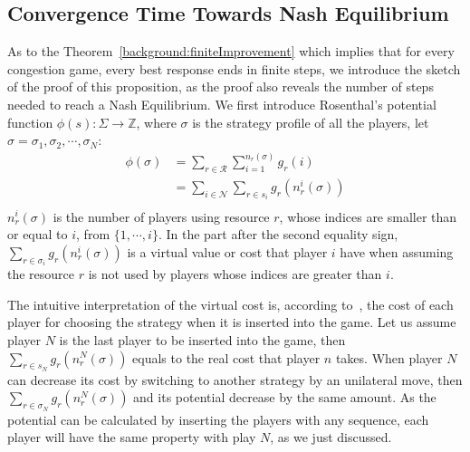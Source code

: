 \subsection{Convergence Time Towards Nash Equilibrium}
As to the Theorem~\ref{background:finiteImprovement} which implies that for every congestion game, every best response ends in finite steps, we introduce the sketch of the proof of this proposition, as the proof also reveals the number of steps needed to reach a Nash Equilibrium.
We first introduce Rosenthal's potential function $\phi(s):\Sigma\rightarrow \mathbb{Z}$, where $\sigma$ is the strategy profile of all the players, let $\sigma = \sigma_1, \sigma_2,\cdots, \sigma_N$:
\begin{equation}
\label{2:Rosenthal_potential}
\begin{split}
\phi(\sigma) 
& =\sum\limits^{}_{r\in \mathcal{R}} \sum\limits^{n_r(\sigma)}_{i=1} g_r(i)\\
& =\sum\limits_{i\in \mathcal{N}} \sum\limits^{}_{r\in s_i} g_r(n_r^i(\sigma))\\
\end{split}
\end{equation}
$n_r^i(\sigma)$ is the number of players using resource $r$, whose indices are smaller than or equal to $i$, \ie from $\{1,\cdots,i\}$. 
In the part after the second equality sign, $\sum\limits^{}_{r\in \sigma_i} g_r(n_r^i(\sigma))$ is a virtual value or cost that player $i$ have when assuming the resource $r$ is not used by players whose indices are greater than $i$.

The intuitive interpretation of the virtual cost is, according to~\cite{Voecking06congestiongames}, the cost of each player for choosing the strategy when it is inserted into the game.
Let us assume player $N$ is the last player to be inserted into the game, then $\sum\limits^{}_{r\in s_N} g_r(n_r^N(\sigma))$ equals to the real cost that player $n$ takes.
When player $N$ can decrease its cost by switching to another strategy by an unilateral move, then $\sum\limits^{}_{r\in \sigma_N} g_r(n_r^N(\sigma))$ and its potential decrease by the same amount.
As the potential can be calculated by inserting the players with any sequence, each player will have the same property with play $N$, as we just discussed.

